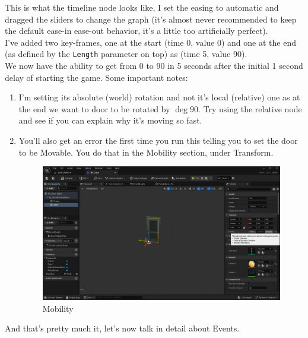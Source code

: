 \documentclass[]{article}
\begin{document}
	This is what the timeline node looks like, I set the easing to automatic and dragged the sliders to change the graph (it's almost never recommended to keep the default ease-in ease-out behavior, it's a little too artificially perfect). \\[10pt] I've added two key-frames, one at the start (time 0, value 0) and one at the end (as defined by the \verb*|Length| parameter on top) as (time 5, value 90). \\[10pt] We now have the ability to get from 0 to 90 in 5 seconds after the initial 1 second delay of starting the game.
	Some important notes:
	\begin{enumerate}
		\item I'm setting its absolute (world) rotation and not it's local (relative) one as at the end we want to door to be rotated by $\deg{90}$. Try using the relative node and see if you can explain why it's moving so fast.
		\item You'll also get an error the first time you run this telling you to set the door to be Movable. You do that in the Mobility section, under Transform.
		\begin{figure}[h]
			\centering
			\includegraphics[width=1\linewidth]{week2part2/screenshot003}
			\caption{Mobility}
			\label{fig:screenshot003}
		\end{figure}
		
	\end{enumerate}
	\newpage
	And that's pretty much it, let's now talk in detail about Events.
	

	
\end{document}
